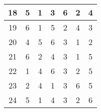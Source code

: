 \begin{table}[]
\begin{tabular}{|c|c|c|c|c|c|c|}
    18                                                       & 5                                                 & 1                                                 & 3                                                 & 6                                                 & 2                                                 & 4                                                 \\ \hline
    19                                                       & 6                                                 & 1                                                 & 5                                                 & 2                                                 & 4                                                 & 3                                                 \\ \hline
    20                                                       & 4                                                 & 5                                                 & 6                                                 & 3                                                 & 1                                                 & 2                                                 \\ \hline
    21                                                       & 6                                                 & 2                                                 & 4                                                 & 3                                                 & 1                                                 & 5                                                 \\ \hline
    22                                                       & 1                                                 & 4                                                 & 6                                                 & 3                                                 & 2                                                 & 5                                                 \\ \hline
    23                                                       & 2                                                 & 4                                                 & 1                                                 & 3                                                 & 6                                                 & 5                                                 \\ \hline
    24                                                       & 5                                                 & 1                                                 & 4                                                 & 3                                                 & 2                                                 & 6                                                 \\ \hline

\end{tabular}
\end{table}

